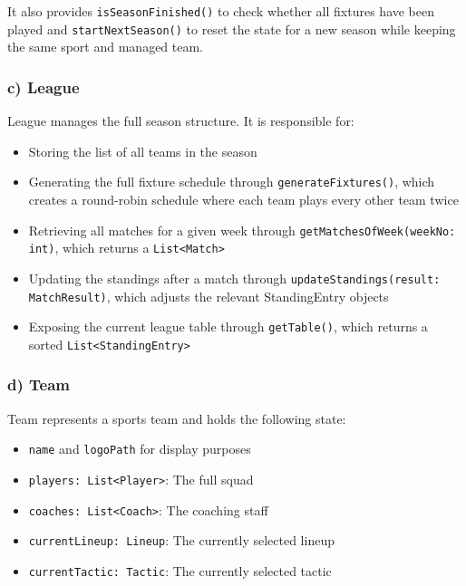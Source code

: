 \documentclass[12pt, a4paper]{article}
\begin{document}
It also provides \texttt{isSeasonFinished()} to check whether all fixtures have been played and
\texttt{startNextSeason()} to reset the state for a new season while keeping the same sport
and managed team.

\subsubsection*{c) League}

League manages the full season structure. It is responsible for:

\begin{itemize}
    \item Storing the list of all teams in the season
    \item Generating the full fixture schedule through \texttt{generateFixtures()}, which creates a round-robin schedule where each team plays every other team twice
    \item Retrieving all matches for a given week through \texttt{getMatchesOfWeek}\allowbreak\texttt{(weekNo:\,int)}, which returns a \texttt{List<Match>}
    \item Updating the standings after a match through \texttt{updateStandings}\allowbreak\texttt{(result:\,MatchResult)}, which adjusts the relevant StandingEntry objects
    \item Exposing the current league table through \texttt{getTable()}, which returns a sorted \texttt{List<StandingEntry>}
\end{itemize}

\subsubsection*{d) Team}

Team represents a sports team and holds the following state:

\begin{itemize}
    \item \texttt{name} and \texttt{logoPath} for display purposes
    \item \texttt{players: List<Player>}: The full squad
    \item \texttt{coaches: List<Coach>}: The coaching staff
    \item \texttt{currentLineup: Lineup}: The currently selected lineup
    \item \texttt{currentTactic: Tactic}: The currently selected tactic
\end{itemize}
\end{document}
